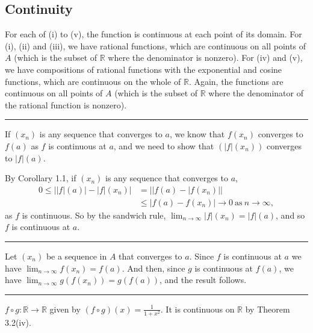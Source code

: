 \documentclass[letterpaper,10pt,english]{jupyterBook}
\begin{document}
\subsection{Continuity}
\label{\detokenize{Solutions-full:continuity}}
\sphinxAtStartPar
{\hyperref[\detokenize{Problems:id13}]{}} For each of (i) to (v), the function is continuous at each point of its domain. For (i), (ii) and (iii), we have rational functions, which are continuous on all points of \(A\) (which is the subset of \(\mathbb{R}\) where the denominator is non\sphinxhyphen{}zero). For (iv) and (v), we have compositions of rational functions with the exponential and cosine functions, which are continuous on the whole of \(\mathbb{R}\). Again, the functions are continuous on all points of \(A\) (which is the subset of \(\mathbb{R}\) where the denominator of the rational function is non\sphinxhyphen{}zero).


\bigskip\hrule\bigskip


\sphinxAtStartPar
{\hyperref[\detokenize{Problems:id14}]{}} If \((x_{n})\) is any sequence that converges to \(a\), we know that \(f(x_n)\) converges to \(f(a)\) as \(f\) is continuous at \(a\), and
we need to show that \((|f|(x_n))\) converges to \(|f|(a)\).

By Corollary 1.1, if \((x_{n})\) is any sequence that converges to \(a\),
\begin{align*}
0 \leq ||f|(a)| -|f|(x_{n})| &= ||f(a) - |f(x_{n})|| \\
&\leq |f(a) - f(x_{n})| \rightarrow 0~\mbox{as}~n \rightarrow \infty, 
\end{align*}
\sphinxAtStartPar
as \(f\) is continuous. So by the sandwich rule, \(\lim_{n\rightarrow\infty} |f|(x_{n}) = |f|(a)\), and so \(f\) is continuous at \(a\).


\bigskip\hrule\bigskip


\sphinxAtStartPar
{\hyperref[\detokenize{Problems:id15}]{}} Let \((x_{n})\) be a sequence in \(A\) that converges to \(a\). Since \(f\) is continuous at \(a\) we have \(\lim_{n\rightarrow\infty} f(x_{n}) = f(a)\). And then, since \(g\) is continuous at \(f(a)\), we have \(\lim_{n\rightarrow\infty} g(f(x_{n})) = g(f(a))\), and the result follows.


\bigskip\hrule\bigskip


\sphinxAtStartPar
{\hyperref[\detokenize{Problems:id16}]{}} \(f \circ g:\mathbb{R}\to \mathbb{R}\) given by \((f \circ g)(x) = \frac{1}{1  + x^{2}}\). It is continuous on \(\mathbb{R}\) by Theorem 3.2(iv).
\end{document}
